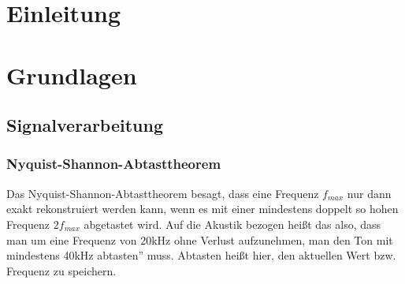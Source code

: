 \begin{abstract}
    
\end{abstract}



\chapter{Einleitung}




\chapter{Grundlagen}
\section{Signalverarbeitung}
\subsection*{Nyquist-Shannon-Abtasttheorem}
\label{sec:Abtast}
Das Nyquist-Shannon-Abtasttheorem besagt, dass eine Frequenz $f_{max}$ nur dann exakt rekonstruiert werden kann, wenn es mit einer mindestens doppelt so hohen Frequenz $2f_{max}$ abgetastet wird. Auf die Akustik bezogen heißt das also, dass man um eine Frequenz von 20kHz ohne Verlust aufzunehmen, 
man den Ton mit mindestens 40kHz \glqq abtasten'' muss. Abtasten heißt hier, den aktuellen Wert bzw. Frequenz zu speichern. 

